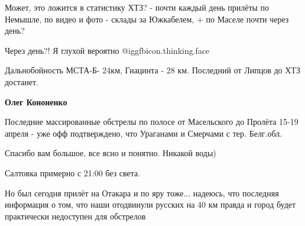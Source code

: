 \begin{itemize}
\begin{itemize}
Может, это ложится в статистику ХТЗ? - почти каждый день прилёты по Немышле, по
видео и фото - склады за Южкабелем, + по Маселе почти через день?

Через день?!
Я глухой вероятно @igg{fbicon.thinking.face} 
\end{itemize} %


Дальнобойность МСТА-Б- 24км, Гиацинта - 28 км. Последний от Липцов до ХТЗ
достанет.

\begin{itemize} %
\textbf{Олег Кононенко} 

Последние массированные обстрелы по полосе от Масельского до Пролёта 15-19
апреля - уже офф подтверждено, что Ураганами и Смерчами с тер. Белг.обл.

\end{itemize} %

Спасибо вам большое, все ясно и понятно. Никакой воды)

Салтовка примерно с 21:00 без света.


Но был сегодня прилёт на Отакара и по яру тоже... надеюсь, что последняя
информация о том, что наши отодвинули русских на 40 км правда и город будет
практически недоступен для обстрелов


\end{itemize} %
